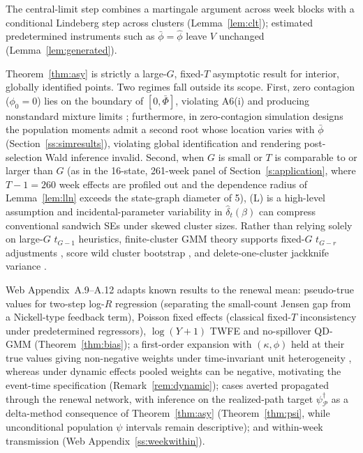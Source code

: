 The central-limit step combines a martingale argument across week blocks with a conditional Lindeberg
step across clusters (Lemma~\ref{lem:clt}); estimated predetermined instruments such as
$\bar\phi=\hat\phi$ leave $V$ unchanged (Lemma~\ref{lem:generated}).

Theorem~\ref{thm:asy} is strictly a large-$G$, fixed-$T$ asymptotic result for interior, globally
identified points. Two regimes fall outside its scope. First, zero contagion ($\phi_0=0$) lies on
the boundary of $[0,\bar\Phi]$, violating A6(i) and producing nonstandard mixture limits
\citep{self1987boundary,andrews1999boundary}; furthermore, in zero-contagion simulation designs
the population moments admit a second root whose location varies with $\bar\phi$
(Section~\ref{ss:simresults}), violating global identification and rendering post-selection Wald
inference invalid. Second, when $G$ is small or $T$ is comparable to or larger than $G$ (as in the
16-state, 261-week panel of Section~\ref{s:application}, where $T-1=260$ week effects are profiled out
and the dependence radius of Lemma~\ref{lem:lln} exceeds the state-graph diameter of 5), (L) is a
high-level assumption and incidental-parameter variability in $\hat\delta_t(\beta)$ can compress
conventional sandwich SEs under skewed cluster sizes. Rather than relying solely on large-$G$
$t_{G-1}$ heuristics, finite-cluster GMM theory supports fixed-$G$ $t_{G-r}$ adjustments
\citep{hwang2021simple,ibragimov2010tstat}, score wild cluster bootstrap \citep{cameron2008bootstrap,kline2012score,webb2023reworking,mackinnon2018few}, and delete-one-cluster jackknife variance \citep{mackinnon2023guide,mackinnon2023jackknife}.

Web Appendix~A.9--A.12 adapts known results to the renewal mean: pseudo-true values for two-step
log-$R$ regression (separating the small-count Jensen gap from a Nickell-type feedback term), Poisson
fixed effects (classical fixed-$T$ inconsistency under predetermined regressors), $\log(Y+1)$ TWFE
and no-spillover QD-GMM (Theorem~\ref{thm:bias}); a first-order expansion with $(\kappa,\phi)$ held
at their true values giving non-negative weights under time-invariant unit heterogeneity
\citep[Proposition~\ref{prop:hetero};][]{goodmanbacon2021did,dechaisemartin2020twfe}, whereas under
dynamic effects pooled weights can be negative, motivating the event-time specification
(Remark~\ref{rem:dynamic}); cases averted propagated through the renewal network, with inference on
the realized-path target $\psi^\dagger_{\mathcal P}$ as a delta-method consequence of
Theorem~\ref{thm:asy} (Theorem~\ref{thm:psi}, while unconditional population $\psi$ intervals remain
descriptive); and within-week transmission (Web Appendix~\ref{ss:weekwithin}).

